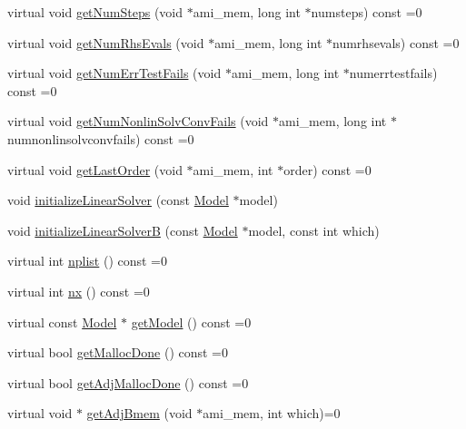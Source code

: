 \begin{DoxyCompactItemize}
\item 
virtual void \mbox{\hyperlink{classamici_1_1_solver_ac72a1a31217465d0f016b38382e487fa}{get\+Num\+Steps}} (void $\ast$ami\+\_\+mem, long int $\ast$numsteps) const =0
\item 
virtual void \mbox{\hyperlink{classamici_1_1_solver_aaf8d4b1375cfa9e517ef0ec54e33d4d8}{get\+Num\+Rhs\+Evals}} (void $\ast$ami\+\_\+mem, long int $\ast$numrhsevals) const =0
\item 
virtual void \mbox{\hyperlink{classamici_1_1_solver_a605fc85e2d8183dca4ebe24f9d810516}{get\+Num\+Err\+Test\+Fails}} (void $\ast$ami\+\_\+mem, long int $\ast$numerrtestfails) const =0
\item 
virtual void \mbox{\hyperlink{classamici_1_1_solver_a34f79927b47e70db74f77943936e18b0}{get\+Num\+Nonlin\+Solv\+Conv\+Fails}} (void $\ast$ami\+\_\+mem, long int $\ast$numnonlinsolvconvfails) const =0
\item 
virtual void \mbox{\hyperlink{classamici_1_1_solver_a491a5e0ffd6c1678a8bb5313df88ab45}{get\+Last\+Order}} (void $\ast$ami\+\_\+mem, int $\ast$order) const =0
\item 
void \mbox{\hyperlink{classamici_1_1_solver_a6f41389f3a02d0b1ed9bfebcc080d3e1}{initialize\+Linear\+Solver}} (const \mbox{\hyperlink{classamici_1_1_model}{Model}} $\ast$model)
\item 
void \mbox{\hyperlink{classamici_1_1_solver_a4f596731d15be6e9e76a2147aa1cce34}{initialize\+Linear\+SolverB}} (const \mbox{\hyperlink{classamici_1_1_model}{Model}} $\ast$model, const int which)
\item 
virtual int \mbox{\hyperlink{classamici_1_1_solver_a9a135f04f34dbf45cf980b97e6906665}{nplist}} () const =0
\item 
virtual int \mbox{\hyperlink{classamici_1_1_solver_a86a18c4e461de76881b6af72e4feb8d9}{nx}} () const =0
\item 
virtual const \mbox{\hyperlink{classamici_1_1_model}{Model}} $\ast$ \mbox{\hyperlink{classamici_1_1_solver_a3ea583e4e53b188c54f426f1bc652a0f}{get\+Model}} () const =0
\item 
virtual bool \mbox{\hyperlink{classamici_1_1_solver_af4bbf9fea3348d86380be1c059e4b9f5}{get\+Malloc\+Done}} () const =0
\item 
virtual bool \mbox{\hyperlink{classamici_1_1_solver_a9673b3bc9248c4b7a156da9632b91436}{get\+Adj\+Malloc\+Done}} () const =0
\item 
virtual void $\ast$ \mbox{\hyperlink{classamici_1_1_solver_a96a36300db9c200d9586c2b90ced4195}{get\+Adj\+Bmem}} (void $\ast$ami\+\_\+mem, int which)=0

\end{DoxyCompactItemize}
